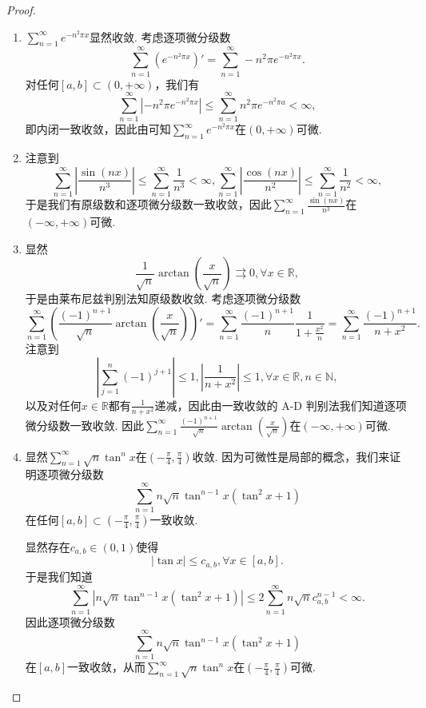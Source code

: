 \documentclass[../../main.tex]{subfiles}
\begin{document}
\begin{proof}
\begin{enumerate}
\item \(\sum_{n=1}^{\infty} e^{-n^2 \pi x}\)显然收敛. 考虑逐项微分级数
\[
\sum_{n=1}^{\infty} \left( e^{-n^2 \pi x} \right)' = \sum_{n=1}^{\infty} -n^2 \pi e^{-n^2 \pi x}.
\]
对任何\([a, b] \subset (0, +\infty)\)，我们有
\[
\sum_{n=1}^{\infty} \left| -n^2 \pi e^{-n^2 \pi x} \right| \leqslant \sum_{n=1}^{\infty} n^2 \pi e^{-n^2 \pi a} < \infty,
\]
即内闭一致收敛，因此由可知\(\sum_{n=1}^{\infty} e^{-n^2 \pi x}\)在\((0, +\infty)\)可微.

\item  注意到
\[
\sum_{n=1}^{\infty} \left| \frac{\sin(nx)}{n^3} \right| \leqslant \sum_{n=1}^{\infty} \frac{1}{n^3} < \infty, \sum_{n=1}^{\infty} \left| \frac{\cos(nx)}{n^2} \right| \leqslant \sum_{n=1}^{\infty} \frac{1}{n^2} < \infty,
\]
于是我们有原级数和逐项微分级数一致收敛，因此\(\sum_{n=1}^{\infty} \frac{\sin(nx)}{n^3}\)在\((-\infty, +\infty)\)可微.

\item 显然
\[
\frac{1}{\sqrt{n}} \arctan \left( \frac{x}{\sqrt{n}} \right) \rightrightarrows 0, \forall x \in \mathbb{R},
\]
于是由莱布尼兹判别法知原级数收敛. 考虑逐项微分级数
\[
\sum_{n=1}^{\infty} \left( \frac{(-1)^{n+1}}{\sqrt{n}} \arctan \left( \frac{x}{\sqrt{n}} \right) \right)' = \sum_{n=1}^{\infty} \frac{(-1)^{n+1}}{n} \frac{1}{1 + \frac{x^2}{n}} = \sum_{n=1}^{\infty} \frac{(-1)^{n+1}}{n + x^2}.
\]
注意到
\[
\left| \sum_{j=1}^{n} (-1)^{j+1} \right| \leqslant 1, \left| \frac{1}{n + x^2} \right| \leqslant 1, \forall x \in \mathbb{R}, n \in \mathbb{N},
\]
以及对任何\(x \in \mathbb{R}\)都有\(\frac{1}{n + x^2}\)递减，因此由一致收敛的 A-D 判别法我们知道逐项微分级数一致收敛. 因此\(\sum_{n=1}^{\infty} \frac{(-1)^{n+1}}{\sqrt{n}} \arctan \left( \frac{x}{\sqrt{n}} \right)\)在\((-\infty, +\infty)\)可微.

\item 显然\(\sum_{n=1}^{\infty} \sqrt{n} \tan^n x\)在\(\left( -\frac{\pi}{4}, \frac{\pi}{4} \right)\)收敛. 因为可微性是局部的概念，我们来证明逐项微分级数
\[
\sum_{n=1}^{\infty} n \sqrt{n} \tan^{n - 1} x \left( \tan^2 x + 1 \right)
\]
在任何\([a, b] \subset \left( -\frac{\pi}{4}, \frac{\pi}{4} \right)\)一致收敛.

显然存在\(c_{a,b} \in (0, 1)\)使得
\[
|\tan x| \leqslant c_{a,b}, \forall x \in [a, b].
\]
于是我们知道
\[
\sum_{n=1}^{\infty} \left| n \sqrt{n} \tan^{n - 1} x \left( \tan^2 x + 1 \right) \right| \leqslant 2 \sum_{n=1}^{\infty} n \sqrt{n} c_{a,b}^{n - 1} < \infty.
\]
因此逐项微分级数
\[
\sum_{n=1}^{\infty} n \sqrt{n} \tan^{n - 1} x \left( \tan^2 x + 1 \right)
\]
在\([a, b]\)一致收敛，从而\(\sum_{n=1}^{\infty} \sqrt{n} \tan^n x\)在\(\left( -\frac{\pi}{4}, \frac{\pi}{4} \right)\)可微.
\end{enumerate}

\end{proof}
\end{document}
